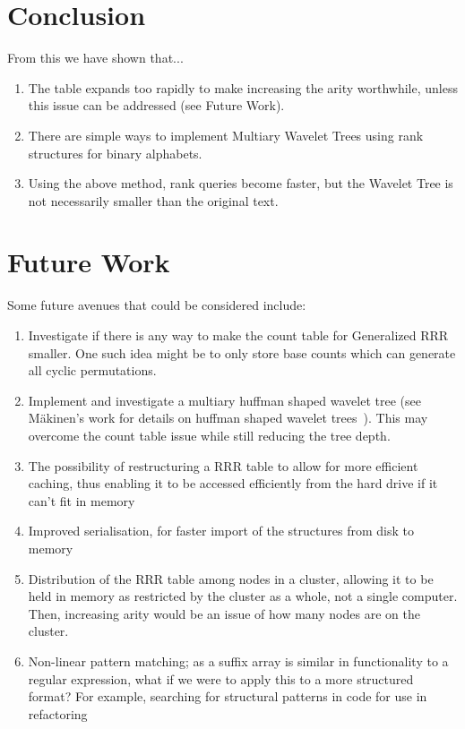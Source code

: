 \section{Conclusion}
From this we have shown that...
\begin{enumerate}
\item
 	The table expands too rapidly to make increasing the arity worthwhile,
	unless this issue can be addressed (see Future Work).
\item
	There are simple ways to implement Multiary Wavelet Trees using rank
	structures for binary alphabets.
\item
	Using the above method, rank queries become faster, but the Wavelet Tree is 
	not necessarily smaller than the original text.
\end{enumerate}

\section{Future Work}
Some future avenues that could be considered include:

\begin{enumerate}
\item
	Investigate if there is any way to make the count table for Generalized RRR 
	smaller. One such idea might be to only store base counts which can
	generate all cyclic permutations.
	
\item
	Implement and investigate a multiary huffman shaped wavelet tree (see 
	M\"{a}kinen's work for details on huffman shaped wavelet
	trees~\cite{huffmanWT:makinen2005}). This may
	overcome the count table issue while still reducing the tree depth.

\item
	The possibility of restructuring a RRR table to allow for more
    efficient caching, thus enabling it to be accessed efficiently from the
	hard drive if it can't fit in memory

\item
	Improved serialisation, for faster import of the structures from disk to
	memory

\item
	Distribution of the RRR table among nodes in a cluster, allowing it to be
	held in memory as restricted by the cluster as a whole, not a single
	computer. Then, increasing arity would be an issue of how many nodes are
	on the cluster.

\item
	Non-linear pattern matching; as a suffix array is similar in functionality
	to a regular expression, what if we were to apply this to a more 
	structured format? For example, searching for structural patterns in code
	for use in refactoring
\end{enumerate}